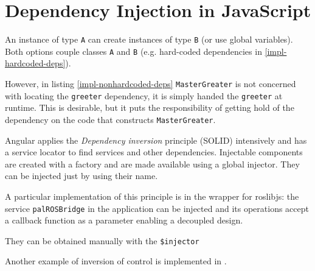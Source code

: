 

\section{Dependency Injection in JavaScript}
An instance of type \texttt{A} can create instances of type \texttt{B} (or use global variables). 
Both options couple classes \texttt{A} and \texttt{B} (e.g. hard-coded dependencies in \ref{impl-hardcoded-deps}).





However, in listing \ref{impl-nonhardcoded-deps} \texttt{MasterGreater} is not concerned with locating the \texttt{greeter} dependency, it is simply handed the \texttt{greeter} at runtime.
This is desirable, but it puts the responsibility of getting hold of the dependency on the code that constructs \texttt{MasterGreater}.

Angular applies the \emph{Dependency inversion} principle (\acs{SOLID}) intensively and has a service locator to find services and other dependencies.
Injectable components are created with a factory and are made available using a global injector.
They can be injected just by using their name.

A particular implementation of this principle is in the wrapper for roslibjs: the service \texttt{palROSBridge} in the application can be injected and its operations accept a callback function as a parameter enabling a decoupled design.



They can be obtained manually with the \texttt{\$injector}



Another example of inversion of control is implemented in .

